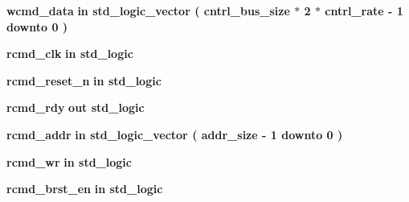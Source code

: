 \begin{DoxyCompactItemize}
\item 
{\bf wcmd\+\_\+data}  {\bfseries {\bfseries \textcolor{keywordflow}{in}\textcolor{vhdlchar}{ }}} {\bfseries \textcolor{comment}{std\+\_\+logic\+\_\+vector}\textcolor{vhdlchar}{ }\textcolor{vhdlchar}{(}\textcolor{vhdlchar}{ }\textcolor{vhdlchar}{ }\textcolor{vhdlchar}{ }\textcolor{vhdlchar}{ }{\bfseries {\bf cntrl\+\_\+bus\+\_\+size}} \textcolor{vhdlchar}{$\ast$}\textcolor{vhdlchar}{ } \textcolor{vhdldigit}{2} \textcolor{vhdlchar}{$\ast$}\textcolor{vhdlchar}{ }\textcolor{vhdlchar}{ }\textcolor{vhdlchar}{ }{\bfseries {\bf cntrl\+\_\+rate}} \textcolor{vhdlchar}{-\/}\textcolor{vhdlchar}{ } \textcolor{vhdldigit}{1} \textcolor{vhdlchar}{ }\textcolor{keywordflow}{downto}\textcolor{vhdlchar}{ }\textcolor{vhdlchar}{ } \textcolor{vhdldigit}{0} \textcolor{vhdlchar}{ }\textcolor{vhdlchar}{)}\textcolor{vhdlchar}{ }} 
\item 
{\bf rcmd\+\_\+clk}  {\bfseries {\bfseries \textcolor{keywordflow}{in}\textcolor{vhdlchar}{ }}} {\bfseries \textcolor{comment}{std\+\_\+logic}\textcolor{vhdlchar}{ }} 
\item 
{\bf rcmd\+\_\+reset\+\_\+n}  {\bfseries {\bfseries \textcolor{keywordflow}{in}\textcolor{vhdlchar}{ }}} {\bfseries \textcolor{comment}{std\+\_\+logic}\textcolor{vhdlchar}{ }} 
\item 
{\bf rcmd\+\_\+rdy}  {\bfseries {\bfseries \textcolor{keywordflow}{out}\textcolor{vhdlchar}{ }}} {\bfseries \textcolor{comment}{std\+\_\+logic}\textcolor{vhdlchar}{ }} 
\item 
{\bf rcmd\+\_\+addr}  {\bfseries {\bfseries \textcolor{keywordflow}{in}\textcolor{vhdlchar}{ }}} {\bfseries \textcolor{comment}{std\+\_\+logic\+\_\+vector}\textcolor{vhdlchar}{ }\textcolor{vhdlchar}{(}\textcolor{vhdlchar}{ }\textcolor{vhdlchar}{ }\textcolor{vhdlchar}{ }\textcolor{vhdlchar}{ }{\bfseries {\bf addr\+\_\+size}} \textcolor{vhdlchar}{-\/}\textcolor{vhdlchar}{ } \textcolor{vhdldigit}{1} \textcolor{vhdlchar}{ }\textcolor{keywordflow}{downto}\textcolor{vhdlchar}{ }\textcolor{vhdlchar}{ } \textcolor{vhdldigit}{0} \textcolor{vhdlchar}{ }\textcolor{vhdlchar}{)}\textcolor{vhdlchar}{ }} 
\item 
{\bf rcmd\+\_\+wr}  {\bfseries {\bfseries \textcolor{keywordflow}{in}\textcolor{vhdlchar}{ }}} {\bfseries \textcolor{comment}{std\+\_\+logic}\textcolor{vhdlchar}{ }} 
\item 
{\bf rcmd\+\_\+brst\+\_\+en}  {\bfseries {\bfseries \textcolor{keywordflow}{in}\textcolor{vhdlchar}{ }}} {\bfseries \textcolor{comment}{std\+\_\+logic}\textcolor{vhdlchar}{ }} 

\end{DoxyCompactItemize}
